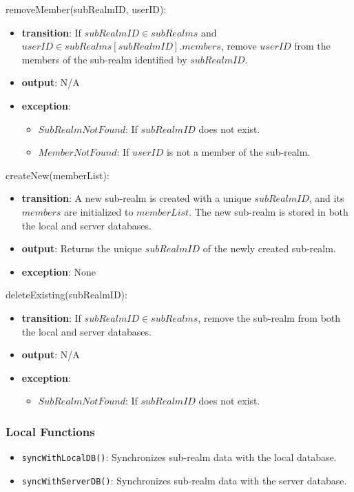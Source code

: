 \documentclass[12pt, titlepage]{article}
\begin{document}
\noindent removeMember(subRealmID, userID):
\begin{itemize}
  \item \textbf{transition}:
        If \( subRealmID \in subRealms \) and \( userID \in subRealms[subRealmID].members \), remove \( userID \) from the members of the sub-realm identified by \( subRealmID \).
  \item \textbf{output}: N/A
  \item \textbf{exception}:
        \begin{itemize}
          \item \( SubRealmNotFound \): If \( subRealmID \) does not exist.
          \item \( MemberNotFound \): If \( userID \) is not a member of the sub-realm.
        \end{itemize}
\end{itemize}

\noindent createNew(memberList):
\begin{itemize}
  \item \textbf{transition}:
        A new sub-realm is created with a unique \( subRealmID \), and its \( members \) are initialized to \( memberList \).
        The new sub-realm is stored in both the local and server databases.
  \item \textbf{output}: Returns the unique \( subRealmID \) of the newly created sub-realm.
  \item \textbf{exception}: None
\end{itemize}

\noindent deleteExisting(subRealmID):
\begin{itemize}
  \item \textbf{transition}:
        If \( subRealmID \in subRealms \), remove the sub-realm from both the local and server databases.
  \item \textbf{output}: N/A
  \item \textbf{exception}:
        \begin{itemize}
          \item \( SubRealmNotFound \): If \( subRealmID \) does not exist.
        \end{itemize}
\end{itemize}

\subsubsection{Local Functions}

\begin{itemize}
  \item \texttt{syncWithLocalDB()}: Synchronizes sub-realm data with the local database.
  \item \texttt{syncWithServerDB()}: Synchronizes sub-realm data with the server database.
\end{itemize}
\end{document}
